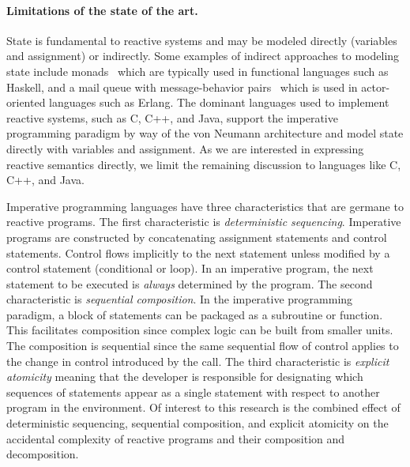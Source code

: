 \paragraph{Limitations of the state of the art.}
State is fundamental to reactive systems and may be modeled directly (variables and assignment) or indirectly.
Some examples of indirect approaches to modeling state include monads~\cite{wadler1990comprehending} which are typically used in functional languages such as Haskell, and a mail queue with message-behavior pairs~\cite{agha1985actors} which is used in actor-oriented languages such as Erlang.
The dominant languages used to implement reactive systems, such as C, C++, and Java, support the imperative programming paradigm by way of the von Neumann architecture and model state directly with variables and assignment.
As we are interested in expressing reactive semantics directly, we limit the remaining discussion to languages like C, C++, and Java.

Imperative programming languages have three characteristics that are germane to reactive programs.
The first characteristic is \emph{deterministic sequencing}.
Imperative programs are constructed by concatenating assignment statements and control statements.
Control flows implicitly to the next statement unless modified by a control statement (conditional or loop).
In an imperative program, the next statement to be executed is \emph{always} determined by the program.
The second characteristic is \emph{sequential composition}.
In the imperative programming paradigm, a block of statements can be packaged as a subroutine or function.
This facilitates composition since complex logic can be built from smaller units.
The composition is sequential since the same sequential flow of control applies to the change in control introduced by the call.
The third characteristic is \emph{explicit atomicity} meaning that the developer is responsible for designating which sequences of statements appear as a single statement with respect to another program in the environment.
Of interest to this research is the combined effect of deterministic sequencing, sequential composition, and explicit atomicity on the accidental complexity of reactive programs and their composition and decomposition.

